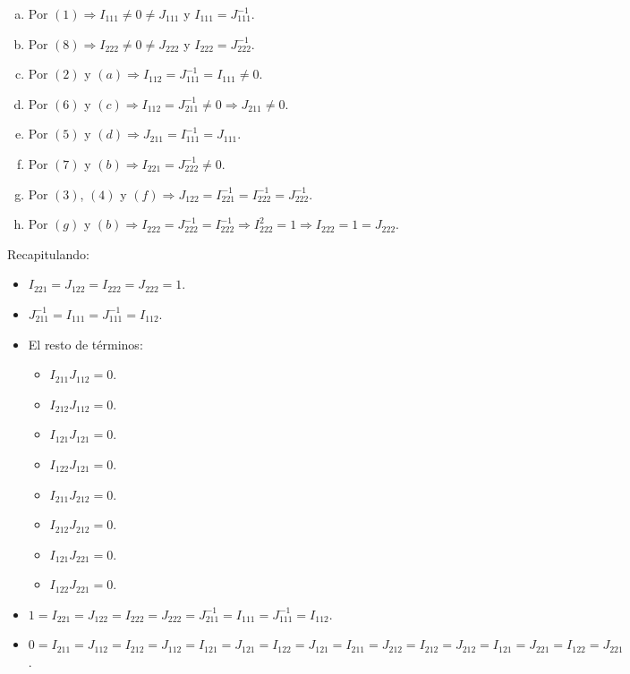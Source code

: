 \documentclass[a4paper, titlepage]{article}
\begin{document}
\begin{enumerate}[(a)]
	\item Por $(1) \Rightarrow I_{111} \neq 0 \neq J_{111}$ y $I_{111} = J_{111}^{-1}$.
	\item Por $(8) \Rightarrow I_{222} \neq 0 \neq J_{222}$ y $I_{222} = J_{222}^{-1}$.
	\item Por $(2)$ y $(a) \Rightarrow I_{112} = J_{111}^{-1} = I_{111} \neq 0$.
	\item Por $(6)$ y $(c) \Rightarrow I_{112} = J_{211}^{-1} \neq 0 \Rightarrow J_{211} \neq 0$.
	\item Por $(5)$ y $(d) \Rightarrow J_{211} = I_{111}^{-1} = J_{111}$.
	\item Por $(7)$ y $(b) \Rightarrow I_{221} = J_{222}^{-1} \neq 0$.
	\item Por $(3)$, $(4)$ y $(f) \Rightarrow J_{122} = I_{221}^{-1} = I_{222}^{-1} = J_{222}^{-1}$.
	\item Por $(g)$ y $(b) \Rightarrow I_{222} = J_{222}^{-1} = I_{222}^{-1} \Rightarrow I_{222}^2 = 1 \Rightarrow I_{222} = 1 = J_{222}$.
\end{enumerate}

\newpage

Recapitulando:

\begin{itemize}
	\item $I_{221} = J_{122} = I_{222} = J_{222} = 1$.
	\item $J_{211}^{-1} = I_{111} = J_{111}^{-1} = I_{112}$.
	\item El resto de términos:

	\begin{itemize}
		\item $I_{211} J_{112} = 0$.
		\item $I_{212} J_{112} = 0$.
		\item $I_{121} J_{121} = 0$.
		\item $I_{122} J_{121} = 0$.
		\item $I_{211} J_{212} = 0$.
		\item $I_{212} J_{212} = 0$.
		\item $I_{121} J_{221} = 0$.
		\item $I_{122} J_{221} = 0$.
	\end{itemize}
\end{itemize}

\begin{itemize}
	\item $1 = I_{221} = J_{122} = I_{222} = J_{222} = J_{211}^{-1} = I_{111} = J_{111}^{-1} = I_{112}$.
	\item $0 = I_{211} = J_{112} = I_{212} = J_{112} = I_{121} = J_{121} = I_{122} = J_{121} = I_{211} = J_{212} = I_{212} = J_{212} = I_{121} = J_{221} = I_{122} = J_{221}$.
\end{itemize}
\end{document}
